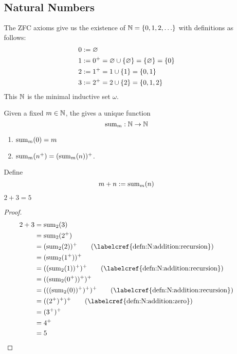 \subsection{Natural Numbers}

The ZFC axioms give us the existence of $\N = \set{0, 1, 2, \dots}$ with definitions as follows:
\begin{align*}
    0 &:= \varnothing \\
    1 &:= 0^{+} = \varnothing \cup \set{\varnothing} = \set{\varnothing} = \set{0} \\
    2 &:= 1^{+} = 1 \cup \set{1} = \set{0, 1} \\
    3 &:= 2^{+} = 2 \cup \set{2} = \set{0, 1, 2}
\end{align*}
This $\mathbb{N}$ is the minimal inductive set $\omega$.

\begin{defn} \label{defn:N:addition}
    Given a fixed $m \in \mathbb{N}$, the  gives a unique function \[
        \mathrm{sum}_{m} : \mathbb{N} \to \mathbb{N}
    \]
    \begin{enumerate}[label=(A\arabic*)]
        \item\label{defn:N:addition:zero} $\mathrm{sum}_{m}({0}) = m$ 
        \item\label{defn:N:addition:recursion} $\mathrm{sum}_{m}({n^{+}}) = (\mathrm{sum}_{m}({n}))^{+}$.
    \end{enumerate}
    Define \[
        m + n := \mathrm{sum}_{m}({n})
    \]
\end{defn}

\begin{prop} \label{thm:N:2+3=5}
    $2 + 3 = 5$
\end{prop}
\begin{proof}
    \begin{align*}
        2 + 3 &= \psum{2}{3} \\
        &= \psum{2}{2^{+}} \\
        &= (\psum{2}{2})^{+} \tag{\labelcref{defn:N:addition:recursion}}\\
        &= (\psum{2}{1^{+}})^{+} \\
        &= ((\psum{2}{1})^{+})^{+} \tag{\labelcref{defn:N:addition:recursion}}\\
        &= ((\psum{2}{0^{+}})^{+})^{+} \\
        &= (((\psum{2}{0})^{+})^{+})^{+} \tag{\labelcref{defn:N:addition:recursion}}\\
        &= ((2^{+})^{+})^{+} \tag{\labelcref{defn:N:addition:zero}}\\
        &= (3^{+})^{+} \\
        &= 4^{+} \\
        &= 5 \qedhere
    \end{align*}
\end{proof}

